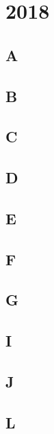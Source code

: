 \section{2018}
\subsection{A}
\raggedbottom
\hrulefill
\subsection{B}
\raggedbottom
\hrulefill
\subsection{C}
\raggedbottom
\hrulefill
\subsection{D}
\raggedbottom
\hrulefill
\subsection{E}
\raggedbottom
\hrulefill
\subsection{F}
\raggedbottom
\hrulefill
\subsection{G}
\raggedbottom
\hrulefill
\subsection{I}
\raggedbottom
\hrulefill
\subsection{J}
\raggedbottom
\hrulefill
\subsection{L}
\raggedbottom
\hrulefill

